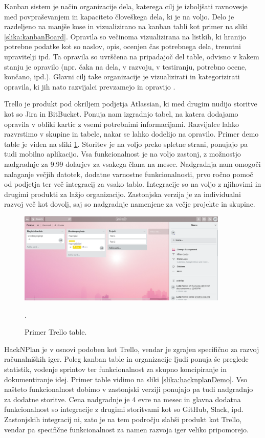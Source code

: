 \documentclass[12pt,a4paper,twoside]{book}
\begin{document}
Kanban sistem je način organizacije dela, katerega cilj je izboljšati ravnovesje med povpraševanjem in kapaciteto človeškega dela, ki je na voljo. Delo je razdeljeno na manjše kose in vizualizirano na kanban tabli kot primer na sliki \ref{slika:kanbanBoard}. Opravila so večinoma vizualizirana na listkih, ki hranijo potrebne podatke kot so naslov, opis, ocenjen čas potrebnega dela, trenutni upravitelji ipd. Ta opravila so uvrščena na pripadajoč del table, odvisno v kakem stanju je opravilo (npr. čaka na dela, v razvoju, v testiranju, potrebno ocene, končano, ipd.). Glavni cilj take organizacije je vizualizirati in kategorizirati opravila, ki jih nato razvijalci prevzamejo in opravijo \cite{kanbanBoard}.

Trello je produkt pod okriljem podjetja Atlassian, ki med drugim nudijo storitve kot so Jira in BitBucket. Ponuja nam izgradnjo tabel, na katera dodajamo opravila v obliki kartic z vsemi potrebnimi informacijami. Razvijalce lahko razvrstimo v skupine in tabele, nakar se lahko dodelijo na opravilo. Primer demo table je viden na sliki \ref{slika:trelloDemo}. Storitev je na voljo preko spletne strani, ponujajo pa tudi mobilno aplikacijo. Vsa funkcionalnost je na voljo zastonj, z možnostjo nadgradnje za 9.99 dolarjev za vsakega člana na mesec. Nadgradnja nam omogoči nalaganje večjih datotek, dodatne varnostne funkcionalnosti, prvo ročno pomoč od podjetja ter več integracij za vsako tablo. Integracije so na voljo z njihovimi in drugimi produkti za lažjo organizacijo. Zastonjska verzija je za individualni razvoj več kot dovolj, saj so nadgradnje namenjene za večje projekte in skupine.

\begin{figure}[h]
	\centering
	\includegraphics[width=10cm]{trelloBoardDemo}
	\caption{Primer Trello table.}.
	\label{slika:trelloDemo}
	\vspace*{-2em}
\end{figure}

HackNPlan je v osnovi podoben kot Trello, vendar je zgrajen specifično za razvoj računalniških iger. Poleg kanban table in organizacije ljudi ponuja še preglede statistik, vodenje sprintov ter funkcionalnost za skupno koncipiranje in dokumentiranje idej. Primer table vidimo na sliki \ref{slika:hacknplanDemo}. Vso našteto funkcionalnost dobimo v zastonjski verziji ponujajo pa tudi nadgradnjo za dodatne storitve. Cena nadgradnje je 4 evre na mesec in glavna dodatna funkcionalnost so integracije z drugimi storitvami kot so GitHub, Slack, ipd. Zastonjskih integracij ni, zato je na tem področju slabši produkt kot Trello, vendar pa specifične funkcionalnost za namen razvoja iger veliko pripomorejo.
\end{document}
